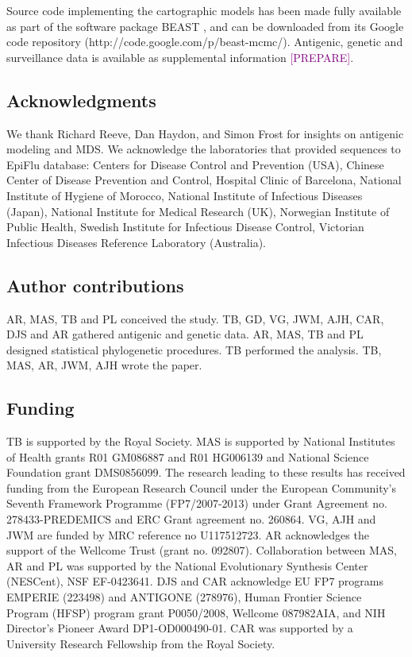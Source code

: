 \documentclass[11pt,oneside,letterpaper]{article}
\def\tbc#1{\textcolor{purple}{[#1]}}
\begin{document}
Source code implementing the cartographic models has been made fully available as part of the software package BEAST \cite{BEAST17}, and can be downloaded from its Google code repository (http://code.google.com/p/beast-mcmc/).
Antigenic, genetic and surveillance data is available as supplemental information \tbc{PREPARE}.

\subsection*{Acknowledgments} 

We thank Richard Reeve, Dan Haydon, and Simon Frost for insights on antigenic modeling and MDS.
We acknowledge the laboratories that provided sequences to EpiFlu database: Centers for Disease Control and Prevention (USA), Chinese Center of Disease Prevention and Control, Hospital Clinic of Barcelona, National Institute of Hygiene of Morocco, National Institute of Infectious Diseases (Japan), National Institute for Medical Research (UK), Norwegian Institute of Public Health, Swedish Institute for Infectious Disease Control, Victorian Infectious Diseases Reference Laboratory (Australia).

\subsection*{Author contributions} 

AR, MAS, TB and PL conceived the study.
TB, GD, VG, JWM, AJH, CAR, DJS and AR gathered antigenic and genetic data.
AR, MAS, TB and PL designed statistical phylogenetic procedures.
TB performed the analysis.
TB, MAS, AR, JWM, AJH wrote the paper.

\subsection*{Funding} 

TB is supported by the Royal Society. 
MAS is supported by National Institutes of Health grants R01 GM086887 and R01 HG006139 and National Science Foundation grant DMS0856099.
The research leading to these results has received funding from the European Research Council under the European Community's Seventh Framework Programme (FP7/2007-2013) under Grant Agreement no. 278433-PREDEMICS and ERC Grant agreement no. 260864.
VG, AJH and JWM are funded by MRC reference no U117512723.
AR acknowledges the support of the Wellcome Trust (grant no. 092807).
Collaboration between MAS, AR and PL was supported by the National Evolutionary Synthesis Center (NESCent), NSF EF-0423641.
DJS and CAR acknowledge EU FP7 programs EMPERIE (223498) and ANTIGONE (278976), Human Frontier Science Program (HFSP) program grant
P0050/2008, Wellcome 087982AIA, and NIH Director's Pioneer Award DP1-OD000490-01.
CAR was supported by a University Research Fellowship from the Royal Society.
\end{document}
